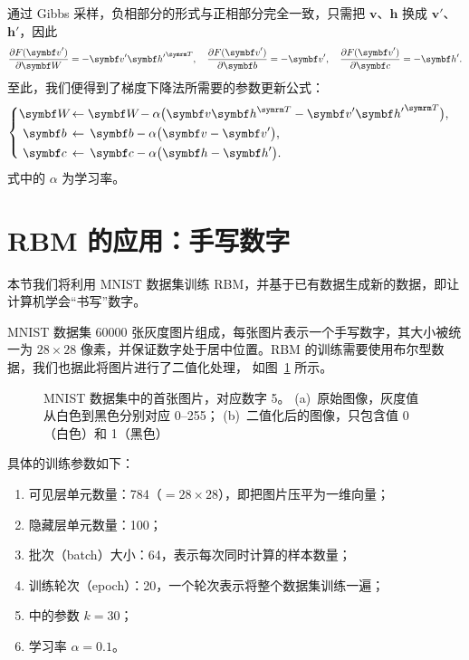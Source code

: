 通过 Gibbs 采样，负相部分的形式与正相部分完全一致，只需把 $\bm{v}$、$\bm{h}$ 换成 $\bm{v}'$、
$\bm{h}'$，因此
\begin{equation}
  \pdv{F(\bm{v}')}{\bm{W}} = - \bm{v}' {\bm{h}'}^\trans \qc
  \pdv{F(\bm{v}')}{\bm{b}} = - \bm{v}' \qc
  \pdv{F(\bm{v}')}{\bm{c}} = - \bm{h}'.
\end{equation}
至此，我们便得到了梯度下降法所需要的参数更新公式：
\begin{equation}
  \left\{
  \begin{aligned}
    \bm{W} \! &\gets \bm{W} \! - \alpha \qty\big(\bm{v} \bm{h}^\trans
                                                 - \bm{v}' {\bm{h}'}^\trans) \qc \\
    \bm{b} \, &\gets \, \bm{b} - \alpha \qty\big(\bm{v} - \bm{v}') \qc \\
    \bm{c} \, &\gets \, \bm{c} - \alpha \qty\big(\bm{h} - \bm{h}').
  \end{aligned}
  \right.
\end{equation}
式中的 $\alpha$ 为学习率。

\section{RBM 的应用：手写数字}

本节我们将利用 MNIST 数据集训练 RBM，并基于已有数据生成新的数据，即让计算机学会“书写”数字。

MNIST 数据集 \num{60000} 张灰度图片组成，每张图片表示一个手写数字，其大小被统一为 $28 \times 28$
像素，并保证数字处于居中位置。RBM 的训练需要使用布尔型数据，我们也据此将图片进行了二值化处理，
如图~\ref{fig:mnist-image} 所示。

\begin{figure}[htb]
  \centering
  \begin{subfigure}[b]{0.35\textwidth}
    \centering
    \caption{}
  \end{subfigure}
  \begin{subfigure}[b]{0.35\textwidth}
    \centering
    \caption{}
  \end{subfigure}
  \caption{MNIST 数据集中的首张图片，对应数字 5。
    (a)~原始图像，灰度值从白色到黑色分别对应 0--255；
    (b)~二值化后的图像，只包含值 0（白色）和 1（黑色）}
  \label{fig:mnist-image}
\end{figure}

具体的训练参数如下：

\begin{enumerate}
  \item 可见层单元数量：784（$=28 \times 28$），即把图片压平为一维向量；
  \item 隐藏层单元数量：100；
  \item 批次（batch）大小：64，表示每次同时计算的样本数量；
  \item 训练轮次（epoch）：20，一个轮次表示将整个数据集训练一遍；
  \item \CDk{} 中的参数 $k=30$；
  \item 学习率 $\alpha=0.1$。
\end{enumerate}

